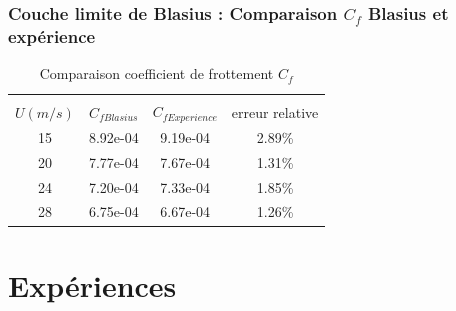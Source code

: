 \documentclass{beamer}
\begin{document}
\begin{frame}
\frametitle{Couche limite de Blasius : Comparaison $C_{f}$ Blasius et expérience}
\begin{table}[ht]
	\centering
	\begin{tabular}{cccc}
		\hline\\
		$U(m/s)$ & $C_{fBlasius}$ &
		$ C_{fExperience}$ & 
		 erreur relative\\
		\hline
   15 & 8.92e-04   & 9.19e-04   & 2.89\%\\
   20 & 7.77e-04   & 7.67e-04   & 1.31\%\\
   24 & 7.20e-04   & 7.33e-04   & 1.85\%\\
   28 & 6.75e-04   & 6.67e-04   & 1.26\%
	\end{tabular}
	\caption{Comparaison coefficient de frottement $C_{f}$}
\end{table}
\end{frame}


\section{Expériences}\label{sec:experience}
\end{document}
